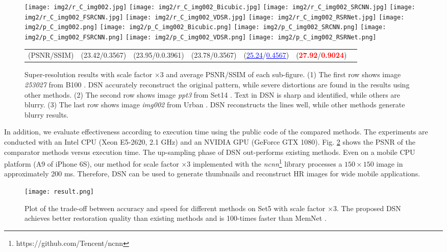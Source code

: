 \documentclass[runningheads]{llncs}
\begin{document}
\begin{figure}[h]
\texttt{[image: img2/r\_C\_img002.jpg]}
\texttt{[image: img2/r\_C\_img002\_Bicubic.jpg]}
\texttt{[image: img2/r\_C\_img002\_SRCNN.jpg]}
\texttt{[image: img2/r\_C\_img002\_FSRCNN.jpg]}
\texttt{[image: img2/r\_C\_img002\_VDSR.jpg]}
\texttt{[image: img2/r\_C\_img002\_RSRNet.jpg]}
\texttt{[image: img2/p\_C\_img002.png]}
\texttt{[image: img2/p\_C\_img002\_Bicubic.png]}
\texttt{[image: img2/p\_C\_img002\_SRCNN.png]}
\texttt{[image: img2/p\_C\_img002\_FSRCNN.png]}
\texttt{[image: img2/p\_C\_img002\_VDSR.png]}
\texttt{[image: img2/p\_C\_img002\_RSRNet.png]}
\begin{tabular}{C{1.925cm}C{1.925cm}C{1.925cm}C{1.925cm}C{1.925cm}C{1.925cm}c}
(PSNR/SSIM)&(23.42/0.3567)&(23.95/0.0.3961)&(23.78/0.3567)&(\textcolor{blue}{\underline{25.24}}/\textcolor{blue}{\underline{0.4567}})&(\textcolor{red}{\textbf{27.92}}/\textcolor{red}{\textbf{0.9024}})&
\end{tabular}
   \caption{Super-resolution results with scale factor $\times 3$ and average PSNR/SSIM of each sub-figure. (1) The first row shows image \emph{253027} from B100 \cite{b100}. DSN accurately reconstruct the original pattern, while severe distortions are found in the results using other methods. (2) The second row shows image \emph{ppt3} from Set14 \cite{set14}. Text in DSN is sharp and identified, while others are blurry. (3) The last row shows image \emph{img002} from Urban \cite{selfex}. DSN reconstructs the lines well, while other methods generate blurry results.
    }
\label{fig:srimg}
\end{figure}

 In addition, we evaluate effectiveness according to execution time using the public code of the compared methods. The experiments are conducted with an Intel CPU (Xeon E5-2620, 2.1 GHz) and an NVIDIA GPU (GeForce GTX 1080). Fig. \ref{fig:result} shows the PSNR of the comparator methods versus execution time. The up-sampling phase of DSN out-performs existing methods. Even on a mobile CPU platform (A9 of iPhone 6S), our method for scale factor $\times3$ implemented with the \emph{ncnn}\footnote{https://github.com/Tencent/ncnn} library processes a $150 \times 150$ image in approximately 200 ms. Therefore, DSN can be used to generate thumbnails and reconstruct HR images for wide mobile applications.
 \begin{figure}[bht]
\begin{center}
   \texttt{[image: result.png]}
\end{center}
   \caption{Plot of the trade-off between accuracy and speed for different methods on Set5 \cite{set5} with scale factor $\times 3$. The proposed DSN achieves better restoration quality than existing methods and is 100-times faster than MemNet \cite{memnet}. }
\label{fig:result}
\end{figure}
\end{document}
